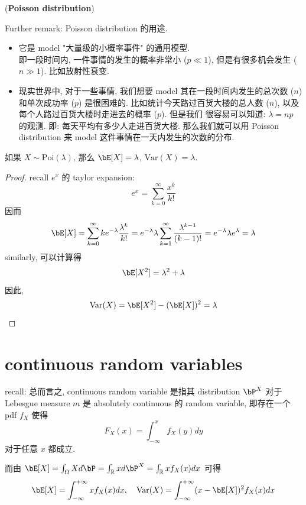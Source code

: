 \begin{example}{(\textbf{Poisson distribution})}
\begin{remark}
Further remark: Poisson distribution 的用途.
\begin{itemize}
    \item 它是 model "大量级的小概率事件" 的通用模型.\\ 
    即一段时间内, 一件事情的发生的概率非常小 (\(p \ll 1\)), 
    但是有很多机会发生 (\(n \gg 1\)). 比如放射性衰变.
    \item 现实世界中, 对于一些事情, 我们想要 model 其在一段时间内发生的总次数 (\(n\)) 和单次成功率 (\(p\)) 
    是很困难的. 比如统计今天路过百货大楼的总人数 (\(n\)), 以及每个人路过百货大楼时走进去的概率 (\(p\)). 但是我们
    很容易可以知道: \(\lambda = np\) 的观测. 即: 每天平均有多少人走进百货大楼. 那么我们就可以用 Poisson distribution 来 model 这件事情在一天内发生的次数的分布.\\
\end{itemize}
\end{remark}
\end{example}

\begin{proposition}
    如果 \(X \sim \text{Poi}(\lambda)\), 那么 \(\bE[X] = \lambda\), \(\text{Var}(X) = \lambda\).
\end{proposition}
\begin{proof}
recall \(e^x\) 的 taylor expansion: \[
e^x = \sum_{k=0}^\infty \frac{x^k}{k!}
\]
因而
    \[
    \bE[X] = \sum_{k=0}^\infty k e^{-\lambda} \frac{\lambda^k}{k!} = 
    e^{-\lambda} \lambda \sum_{k=1}^\infty \frac{\lambda^{k-1}}{(k-1)!} =
    e^{-\lambda} \lambda e^{\lambda} = \lambda
    \]
similarly, 可以计算得 \[
\bE[X^2] = \lambda^2 + \lambda
\]
因此, \[
\text{Var}(X) = \bE[X^2] - (\bE[X])^2 = \lambda
\]
\end{proof}




\section{continuous random variables}
recall: 总而言之, continuous random variable 是指其 distribution \(\bP^X\)
对于 Lebesgue measure \(m\) 是 absolutely continuous 的 random variable, 
即存在一个 pdf \(f_X\) 使得\[
F_X(x) = \int_{-\infty}^x f_X(y) dy 
\] 对于任意 \(x\) 都成立.

而由 \( \bE[X]= \int_{\Omega} X d\bP = \int_{\mathbb{R}} x d\bP^X = \int_{\mathbb{R}} x f_X(x) dx \) 可得 
\[
\bE[X] = \int_{-\infty}^{+\infty} x f_X(x) dx, \quad \text{Var}(X) = \int_{-\infty}^{+\infty} (x-\bE[X])^2 f_X(x) dx
\]

